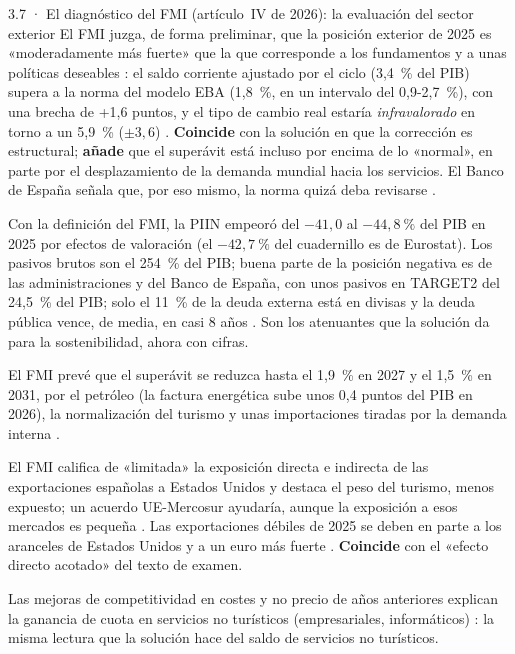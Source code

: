 \begin{complemento}{3.7 · El diagnóstico del FMI (artículo~IV de 2026): la evaluación del sector exterior}
 El FMI juzga, de forma preliminar, que la posición exterior de 2025 es «moderadamente más fuerte» que la que corresponde a los fundamentos y a unas políticas deseables : el saldo corriente ajustado por el ciclo (3,4~\% del PIB) supera a la norma del modelo EBA (1,8~\%, en un intervalo del 0,9-2,7~\%), con una brecha de +1,6 puntos, y el tipo de cambio real estaría \emph{infravalorado} en torno a un 5,9~\% ($\pm3{,}6$) . \textbf{Coincide} con la solución en que la corrección es estructural; \textbf{añade} que el superávit está incluso por encima de lo «normal», en parte por el desplazamiento de la demanda mundial hacia los servicios. El Banco de España señala que, por eso mismo, la norma quizá deba revisarse .

 Con la definición del FMI, la PIIN empeoró del $-41{,}0$ al $-44{,}8~\%$ del PIB en 2025 por efectos de valoración  (el $-42{,}7~\%$ del cuadernillo es de Eurostat). Los pasivos brutos son el 254~\% del PIB; buena parte de la posición negativa es de las administraciones y del Banco de España, con unos pasivos en TARGET2 del 24,5~\% del PIB; solo el 11~\% de la deuda externa está en divisas y la deuda pública vence, de media, en casi 8 años . Son los atenuantes que la solución da para la sostenibilidad, ahora con cifras.

 El FMI prevé que el superávit se reduzca hasta el 1,9~\% en 2027 y el 1,5~\% en 2031, por el petróleo (la factura energética sube unos 0,4 puntos del PIB en 2026), la normalización del turismo y unas importaciones tiradas por la demanda interna .

 El FMI califica de «limitada» la exposición directa e indirecta de las exportaciones españolas a Estados Unidos y destaca el peso del turismo, menos expuesto; un acuerdo UE-Mercosur ayudaría, aunque la exposición a esos mercados es pequeña . Las exportaciones débiles de 2025 se deben en parte a los aranceles de Estados Unidos y a un euro más fuerte . \textbf{Coincide} con el «efecto directo acotado» del texto de examen.

 Las mejoras de competitividad en costes y no precio de años anteriores explican la ganancia de cuota en servicios no turísticos (empresariales, informáticos) : la misma lectura que la solución hace del saldo de servicios no turísticos.
\end{complemento}
